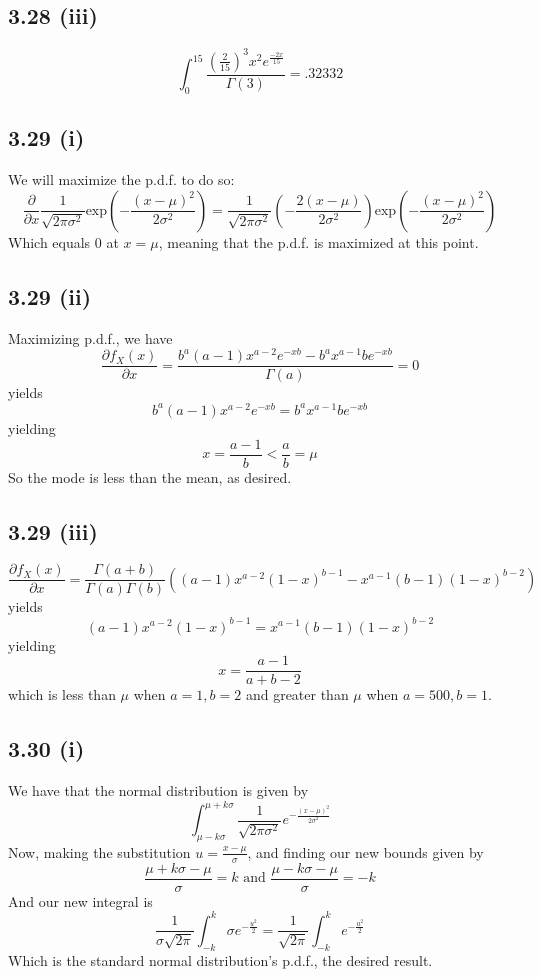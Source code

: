 \documentclass[letterpaper,12pt]{article}
\theoremstyle{definition}
\begin{document}
\subsection*{3.28 (iii)}

\[ \int^{15}_{0} \frac{(\frac{2}{15})^3x^2e^{\frac{-2x}{15}}}{\Gamma(3)} = .32332 \]

\subsection*{3.29 (i)}

We will maximize the p.d.f. to do so:
\[\frac{\partial}{\partial x} \frac{1}{\sqrt{2 \pi \sigma^2}} \text{exp} \left( - \frac{(x-\mu)^2}{2 \sigma^2} \right) = \frac{1}{\sqrt{2 \pi \sigma^2}} \left(- \frac{2(x-\mu)}{2 \sigma^2} \right) 
\text{exp} \left( - \frac{(x-\mu)^2}{2 \sigma^2} \right) \]
Which equals 0 at $x=\mu$, meaning that the p.d.f. is maximized at this point.

\subsection*{3.29 (ii)}

Maximizing p.d.f., we have
\[\frac{\partial f_X(x)}{\partial x} = \frac{b^a(a-1)x^{a-2}e^{-xb} - b^ax^{a-1}be^{-xb}}{\Gamma(a)} = 0 \]
yields
\[ b^a(a-1)x^{a-2}e^{-xb} = b^ax^{a-1}be^{-xb} \]
yielding
\[x = \frac{a-1}{b} < \frac{a}{b} = \mu\]
So the mode is less than the mean, as desired.

\subsection*{3.29 (iii)}
\[\frac{\partial f_X(x)}{\partial x} = \frac{\Gamma(a+b)}{\Gamma(a)\Gamma(b)} \left( (a-1)x^{a-2}(1-x)^{b-1} - x^{a-1}(b-1)(1-x)^{b-2} \right)\]
yields
\[ (a-1)x^{a-2}(1-x)^{b-1} = x^{a-1}(b-1)(1-x)^{b-2} \]
yielding
\[x = \frac{a-1}{a+b-2}\]
which is less than $\mu$ when $a=1, b=2$ and
greater than $\mu$ when $a=500, b=1$.

\subsection*{3.30 (i)}

We have that the normal distribution is given by 
\[\int^{\mu + k \sigma}_{\mu - k \sigma} \frac{1}{\sqrt{2 \pi \sigma^2}} e^{-\frac{(x - \mu)^2}{2\sigma^2}}\]
Now, making the substitution $u = \frac{x-\mu}{\sigma}$, and finding our new bounds given by
\[ \frac{\mu + k \sigma - \mu}{\sigma} = k \text{ and } \frac{\mu - k \sigma - \mu}{\sigma} = -k\]
And our new integral is 
\[ \frac{1}{\sigma\sqrt{2 \pi }}\int^{k}_{-k} \sigma e^{-\frac{u^2}{2}} = \frac{1}{\sqrt{2 \pi }}\int^{k}_{-k}  e^{-\frac{u^2}{2}}\]
Which is the standard normal distribution's p.d.f., the desired result.
\end{document}
